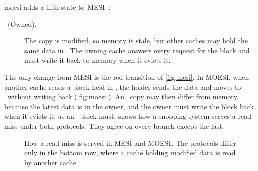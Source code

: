 \Gls{moesi} adds a fifth state to MESI~\cite{sweazey1986moesi}:

\begin{description}
  \item[\stO\ (Owned).] The copy is modified, so memory is stale, but other
    caches may hold the same data in \stS. The owning cache answers every request
    for the block and must write it back to memory when it evicts it.
\end{description}

The only change from MESI is the red transition of \cref{fig:mesi}. In MOESI, when
another cache reads a block held in \stM, the holder sends the data and moves to
\stO\ without writing back (\cref{fig:moesi}). An \stS\ copy may then differ from
memory, because the latest data is in the \gls{owner}, and the owner
must write the block back when it evicts it, as an \stM\ block must.
 shows how a snooping system serves a read miss under both
protocols. They agree on every branch except the last.

\begin{figure}[htbp]
\centering
{}
\caption[Decision tree: serving a read miss]{How a read miss is served in MESI
and MOESI. The protocols differ only in the bottom row, where a cache holding
modified data is read by another cache.}
\label{fig:readmiss-tree}
\end{figure}


